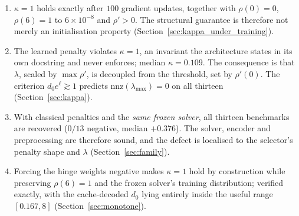 \documentclass[11pt]{article}
\begin{document}
\begin{enumerate}
      levels but does so in only $2.8\%$ of shards.
\item $\kappa = 1$ holds exactly after $100$ gradient updates, together with
      $\rho(0) = 0$, $\rho(6) = 1$ to $6 \times 10^{-8}$ and $\rho' > 0$. The
      structural guarantee is therefore not merely an initialisation property
      (Section~\ref{sec:kappa_under_training}).
\item The learned penalty violates $\kappa = 1$, an invariant the architecture
      states in its own docstring and never enforces; median $\kappa = 0.109$.
      The consequence is that $\lambda$, scaled by $\max\rho'$, is decoupled
      from the threshold, set by $\rho'(0)$. The criterion
      $d_0 e^{\ell} \gtrsim 1$ predicts $\mathrm{nnz}(\lambda_{\max}) = 0$ on
      all thirteen (Section~\ref{sec:kappa}).
\item With classical penalties and the \emph{same frozen solver}, all thirteen
      benchmarks are recovered ($0/13$ negative, median $+0.376$). The solver,
      encoder and preprocessing are therefore sound, and the defect is
      localised to the selector's penalty shape and $\lambda$
      (Section~\ref{sec:family}).
\item Forcing the hinge weights negative makes $\kappa = 1$ hold by
      construction while preserving $\rho(6) = 1$ and the frozen solver's
      training distribution; verified exactly, with the cache-decoded $d_0$
      lying entirely inside the useful range $[0.167, 8]$
      (Section~\ref{sec:monotone}).
\end{enumerate}
\end{document}
